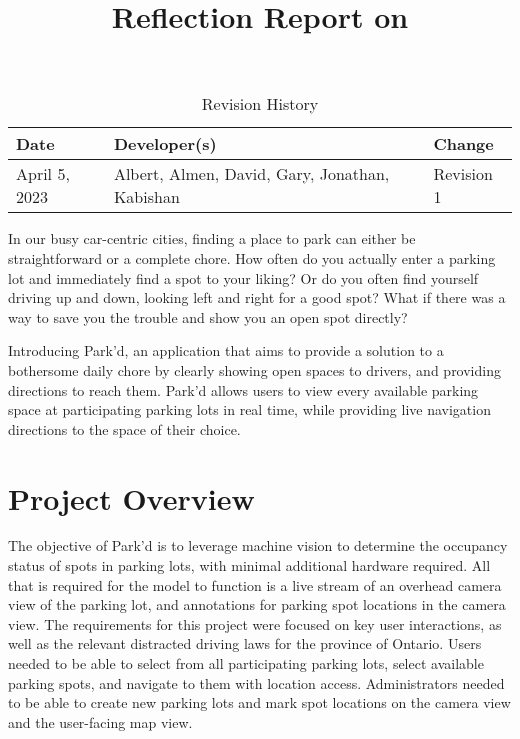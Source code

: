 \documentclass{article}
\title{Reflection Report on \progname}
\author{\authname}
\date{}
\begin{document}
\begin{table}[hp]
\caption{Revision History} \label{TblRevisionHistory}
\begin{tabularx}{\textwidth}{llX}
\toprule
\textbf{Date} & \textbf{Developer(s)} & \textbf{Change}\\
\midrule
April 5, 2023 & Albert, Almen, David, Gary, Jonathan, Kabishan & Revision 1\\
\bottomrule
\end{tabularx}
\end{table}


\newpage

\maketitle

In our busy car-centric cities, finding a place to park can either be
straightforward or a complete chore. How often do you actually enter a parking
lot and immediately find a spot to your liking? Or do you often find yourself
driving up and down, looking left and right for a good spot? What if there was a
way to save you the trouble and show you an open spot directly?

Introducing Park’d, an application that aims to provide a solution to a
bothersome daily chore by clearly showing open spaces to drivers, and providing
directions to reach them. Park’d allows users to view every available parking
space at participating parking lots in real time, while providing live
navigation directions to the space of their choice.

\section{Project Overview}
The objective of Park'd is to leverage machine vision to determine the occupancy
status of spots in parking lots, with minimal additional hardware required. All
that is required for the model to function is a live stream of an overhead
camera view of the parking lot, and annotations for parking spot locations in
the camera view. The requirements for this project were focused on key user
interactions, as well as the relevant distracted driving laws for the province
of Ontario. Users needed to be able to select from all participating parking
lots, select available parking spots, and navigate to them with location access.
Administrators needed to be able to create new parking lots and mark spot
locations on the camera view and the user-facing map view.
\end{document}
